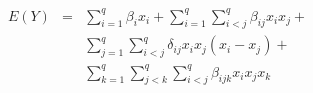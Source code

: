 

\[
\begin{array}{lll} E(Y) & = & \sum_{i=1}^{q}{\beta_{i}x_{i}} + \sum_{i=1}^{q}{\sum_{i < j}^{q}{\beta_{ij}x_{i}x_{j}}} + \\ & & \sum_{j=1}^{q}{\sum_{i < j}^{q}{\delta_{ij}x_{i}x_{j}(x_{i} - x_{j})}} + \\ & & \sum_{k=1}^{q}{\sum_{j < k}^{q}{\sum_{i < j}^{q}{\beta_{ijk}x_{i}x_{j}x_{k}}}} \end{array}
\]


